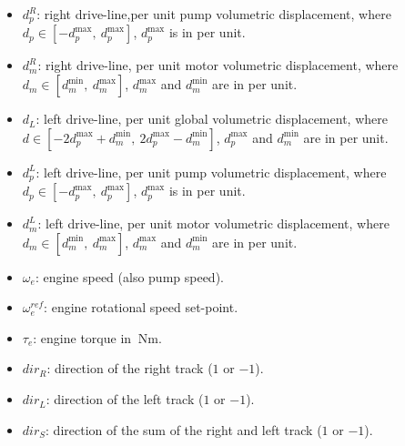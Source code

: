 \documentclass[11pt,a4paper,oneside]{book}
\begin{document}
\begin{onehalfspace}
\begin{itemize}
	\item[--] $d_p^R$: right drive-line,per unit pump volumetric displacement, where $d_p   \in [-d_p^\text{max},\ d_p^\text{max}]$, $d_p^\text{max}$ is in per unit.
	\item[--] $d_m^R$: right drive-line, per unit motor volumetric displacement, where $d_m\in [d_m^\text{min},\ d_m^\text{max}]$, $d_m^\text{max}$ and $d_m^\text{min}$ are in per unit.
	\item[--] $d_L$: left drive-line, per unit global volumetric displacement, where $d\in [-2d_p^\text{max}+d_m^\text{min},\ 2d_p^\text{max}-d_m^\text{min}]$, $d_p^\text{max}$ and $d_m^\text{min}$ are in per unit.
	\item[--] $d_p^L$: left drive-line, per unit pump volumetric displacement, where $d_p\in [-d_p^\text{max},\ d_p^\text{max}]$, $d_p^\text{max}$ is in per unit.
	\item[--] $d_m^L$: left drive-line, per unit motor volumetric displacement, where $d_m\in [d_m^\text{min},\ d_m^\text{max}]$, $d_m^\text{max}$ and $d_m^\text{min}$ are in per unit.
	\item[--] $\omega_e$: engine speed (also pump speed).
	\item[--] $\omega_e^{ref}$: engine rotational speed set-point.
	\item[--] $\tau_e$: engine torque in $\SI{}{\newton\meter}$.
	\item[--] $dir_R$: direction of the right track ($1$ or $-1$).
	\item[--] $dir_L$: direction of the left track ($1$ or $-1$).
	\item[--] $dir_S$: direction of the sum of the right and left track ($1$ or $-1$).
\end{itemize}


\end{onehalfspace}
\end{document}
